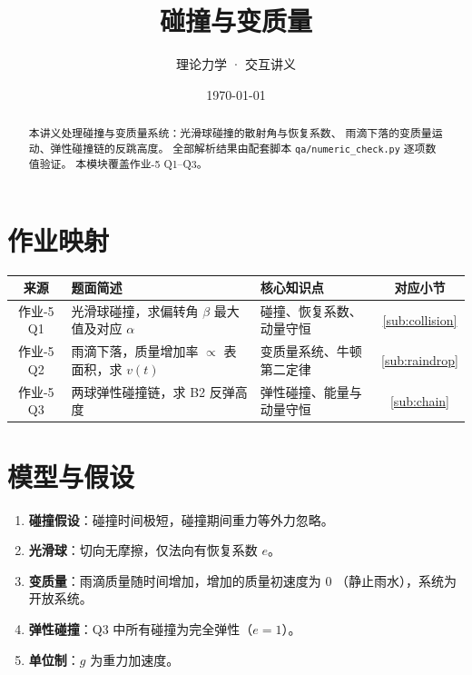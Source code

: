 \documentclass[UTF8,a4paper,11pt]{ctexart}
\title{\textbf{碰撞与变质量}}
\author{理论力学 · 交互讲义}
\date{\today}
\begin{document}
\maketitle

\begin{abstract}
本讲义处理碰撞与变质量系统：光滑球碰撞的散射角与恢复系数、
雨滴下落的变质量运动、弹性碰撞链的反跳高度。
全部解析结果由配套脚本 \texttt{qa/numeric\_check.py} 逐项数值验证。
本模块覆盖作业-5 Q1--Q3。
\end{abstract}

\tableofcontents
\newpage

\section{作业映射}
\label{sec:map}

\begin{center}
\small
\begin{tabular}{cp{6.5cm}p{3.5cm}c}
\toprule
来源 & 题面简述 & 核心知识点 & 对应小节 \\
\midrule
作业-5 Q1 & 光滑球碰撞，求偏转角 $\beta$ 最大值及对应 $\alpha$ &
  碰撞、恢复系数、动量守恒 & \ref{sub:collision} \\
作业-5 Q2 & 雨滴下落，质量增加率 $\propto$ 表面积，求 $v(t)$ &
  变质量系统、牛顿第二定律 & \ref{sub:raindrop} \\
作业-5 Q3 & 两球弹性碰撞链，求 B2 反弹高度 &
  弹性碰撞、能量与动量守恒 & \ref{sub:chain} \\
\bottomrule
\end{tabular}
\end{center}

\section{模型与假设}
\label{sec:model}

\begin{enumerate}
  \item \textbf{碰撞假设}：碰撞时间极短，碰撞期间重力等外力忽略。
  \item \textbf{光滑球}：切向无摩擦，仅法向有恢复系数 $e$。
  \item \textbf{变质量}：雨滴质量随时间增加，增加的质量初速度为 0
        （静止雨水），系统为开放系统。
  \item \textbf{弹性碰撞}：Q3 中所有碰撞为完全弹性（$e=1$）。
  \item \textbf{单位制}：$g$ 为重力加速度。
\end{enumerate}
\end{document}
